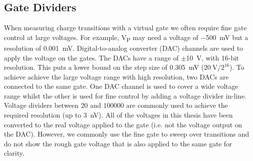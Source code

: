 \subsection{Gate Dividers}
When measuring charge transitions with a virtual gate we often require fine gate control at large voltages. For example, V\textsubscript{P} may need a voltage of $-$\qty{500}{mV} but a resolution of \qty{0.001}{mV}. Digital-to-analog converter (DAC) channels are used to apply the voltage on the gates. The DACs have a range of $\pm$\qty{10}{V}, with 16-bit resolution. This puts a lower bound on the step size of \qty{0.305}{mV} ($\mathrm{\qty{20}{V}/2^{16}}$). To achieve achieve the large voltage range with high resolution, two DACs are connected to the same gate. One DAC channel is used to cover a wide voltage range whilst the other is used for fine control by adding a voltage divider in-line. Voltage dividers between $20$ and $100000$ are commonly used to achieve the required resolution (up to \qty{3}{nV}). All of the voltages in this thesis have been converted to the real voltage applied to the gate (i.e. not the voltage output on the DAC). However, we commonly use the fine gate to sweep over transitions and do not show the rough gate voltage that is also applied to the same gate for clarity. 




 




